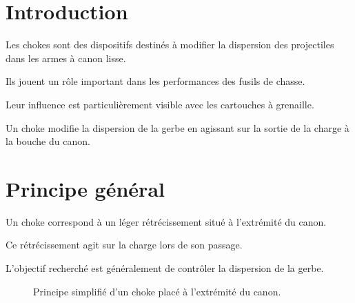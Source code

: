 
\section{Introduction}

Les chokes sont des dispositifs destinés à modifier la dispersion des
projectiles dans les armes à canon lisse.

Ils jouent un rôle important dans les performances des fusils de chasse.

Leur influence est particulièrement visible avec les cartouches à grenaille.

\begin{aretenir}

Un choke modifie la dispersion de la gerbe en agissant sur la sortie de la
charge à la bouche du canon.

\end{aretenir}

\section{Principe général}

Un choke correspond à un léger rétrécissement situé à l'extrémité du canon.

Ce rétrécissement agit sur la charge lors de son passage.

L'objectif recherché est généralement de contrôler la dispersion de la gerbe.

\begin{figure}[htbp]
\centering


\caption{Principe simplifié d'un choke placé à l'extrémité du canon.}
\label{fig:principe_choke}

\end{figure}

